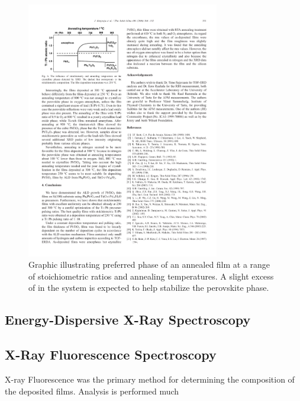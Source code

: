 \begin{figure}[tb]
   \centering
   \includegraphics[width=0.75\textwidth]{./figures/dataanalysis/PTO-phase}
   \caption[Preferred Phase vs. Stoichiometric Ratio]{Graphic illustrating preferred phase of an annealed %
   		film at a range of stoichiometric ratios and annealing temperatures. A slight excess of  %
		in the system is expected to help stabilize the perovskite \PTO{} phase.\cite{harjuoja_2006}}
   \label{fig:PTO-phase}
\end{figure}

\lipsum


\subsection{Energy-Dispersive X-Ray Spectroscopy}



\lipsum


\subsection{X-Ray Fluorescence Spectroscopy}

X-ray Fluorescence was the primary method for determining the composition of the deposited films. Analysis is performed much 


